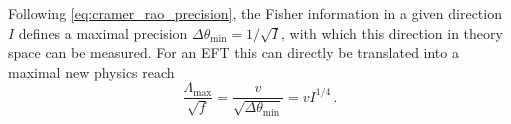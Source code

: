 Following \autoref{eq:cramer_rao_precision}, the Fisher information in a given direction
$I$ defines a maximal precision
$\Delta \theta_{\text{min}} = 1 / \sqrt{I}$, with which this direction
in theory space can be measured. For an EFT this can directly be
translated into a maximal new physics reach
%
\begin{equation}
  \frac {\Lambda_{\text{max}}} {\sqrt{f}} = \frac v {\sqrt{\Delta \theta_{\text{min}}}} =  v I^{1/4} \,.
\end{equation}




